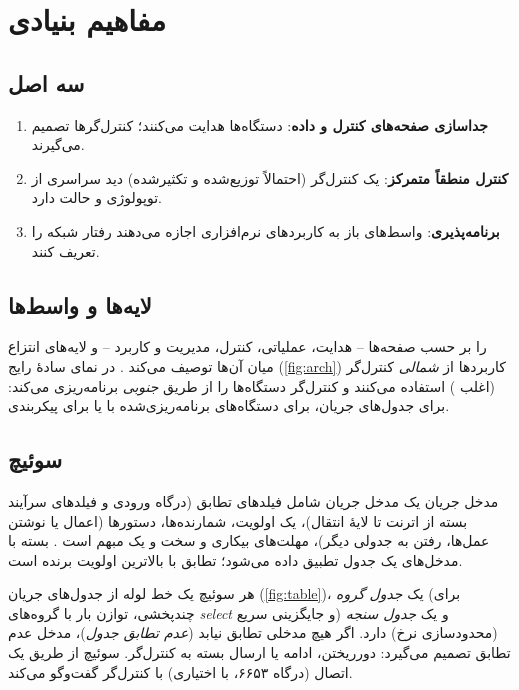 \documentclass[11pt,a4paper]{article}
\begin{document}
\section{مفاهیم بنیادی}

\subsection{سه اصل}
\begin{enumerate}
  \item \textbf{جداسازی صفحه‌های کنترل و داده}: دستگاه‌ها هدایت می‌کنند؛ کنترل‌گرها تصمیم می‌گیرند.
  \item \textbf{کنترل منطقاً متمرکز}: یک کنترل‌گر (احتمالاً توزیع‌شده و تکثیرشده) دید سراسری از توپولوژی و حالت دارد.
  \item \textbf{برنامه‌پذیری}: واسط‌های باز به کاربردهای نرم‌افزاری اجازه می‌دهند رفتار شبکه را تعریف کنند.
\end{enumerate}

\subsection{لایه‌ها و واسط‌ها}
  را بر حسب صفحه‌ها -- هدایت، عملیاتی، کنترل، مدیریت و کاربرد -- و لایه‌های انتزاع میان آن‌ها توصیف
می‌کند \cite{rfc7426}. در نمای سادهٔ رایج (\cref{fig:arch}) کاربردها از  \emph{شمالی} کنترل‌گر (اغلب )
استفاده می‌کنند و کنترل‌گر دستگاه‌ها را از طریق  \emph{جنوبی} برنامه‌ریزی می‌کند: 
\cite{onf2015openflow} برای جدول‌های جریان،  برای دستگاه‌های برنامه‌ریزی‌شده با  یا 
برای پیکربندی.

\begin{acnfigure}
  \caption{لایه‌های : کاربردها، کنترل‌گر و صفحهٔ داده با های شمالی و جنوبی.}
  \label{fig:arch}
\end{acnfigure}

\subsection{سوئیچ }
\begin{definitionbox}{مدخل جریان}
یک مدخل جریان شامل فیلدهای تطابق (درگاه ورودی و فیلدهای سرآیند بسته از اترنت تا لایهٔ انتقال)، یک اولویت، شمارنده‌ها،
دستورها (اعمال یا نوشتن عمل‌ها، رفتن به جدولی دیگر)، مهلت‌های بیکاری و سخت و یک  مبهم است
\cite{onf2015openflow}. بسته با مدخل‌های یک جدول تطبیق داده می‌شود؛ تطابق با بالاترین اولویت برنده است.
\end{definitionbox}
هر سوئیچ یک خط لوله از جدول‌های جریان (\cref{fig:table})، یک \emph{جدول گروه} (برای چندپخشی، توازن بار با گروه‌های
\emph{select} و جایگزینی سریع) و یک \emph{جدول سنجه} (محدودسازی نرخ) دارد. اگر هیچ مدخلی تطابق نیابد (\emph{عدم تطابق
جدول})، مدخل عدم تطابق تصمیم می‌گیرد: دورریختن، ادامه یا ارسال بسته به کنترل‌گر. سوئیچ از طریق یک اتصال  (درگاه
۶۶۵۳، با  اختیاری) با کنترل‌گر گفت‌وگو می‌کند.
\end{document}
